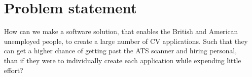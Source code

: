 \section{Problem statement}\label{sec:problem}
How can we make a software solution, that enables the British and American unemployed people, 
to create a large number of CV applications.
Such that they can get a higher chance of getting past the ATS scanner and hiring personal, than
if they were to individually create each application while expending little effort? 
